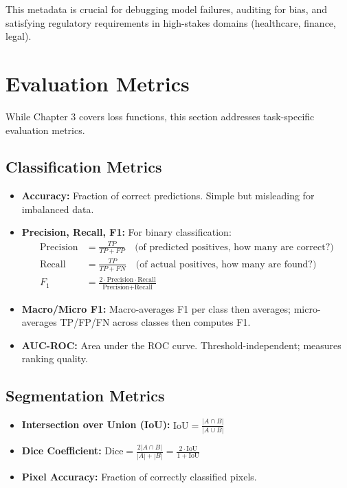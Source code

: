 This metadata is crucial for debugging model failures, auditing for bias, and satisfying regulatory requirements in high-stakes domains (healthcare, finance, legal).

\section{Evaluation Metrics}

While Chapter 3 covers loss functions, this section addresses task-specific evaluation metrics.

\subsection{Classification Metrics}

\begin{itemize}
    \item \textbf{Accuracy:} Fraction of correct predictions. Simple but misleading for imbalanced data.
    \item \textbf{Precision, Recall, F1:} For binary classification:
    \begin{align}
    \text{Precision} &= \frac{TP}{TP + FP} \quad \text{(of predicted positives, how many are correct?)} \\
    \text{Recall} &= \frac{TP}{TP + FN} \quad \text{(of actual positives, how many are found?)} \\
    F_1 &= \frac{2 \cdot \text{Precision} \cdot \text{Recall}}{\text{Precision} + \text{Recall}}
    \end{align}
    \item \textbf{Macro/Micro F1:} Macro-averages F1 per class then averages; micro-averages TP/FP/FN across classes then computes F1.
    \item \textbf{AUC-ROC:} Area under the ROC curve. Threshold-independent; measures ranking quality.
\end{itemize}

\subsection{Segmentation Metrics}

\begin{itemize}
    \item \textbf{Intersection over Union (IoU):} $\text{IoU} = \frac{|A \cap B|}{|A \cup B|}$
    \item \textbf{Dice Coefficient:} $\text{Dice} = \frac{2|A \cap B|}{|A| + |B|} = \frac{2 \cdot \text{IoU}}{1 + \text{IoU}}$
    \item \textbf{Pixel Accuracy:} Fraction of correctly classified pixels.
\end{itemize}

